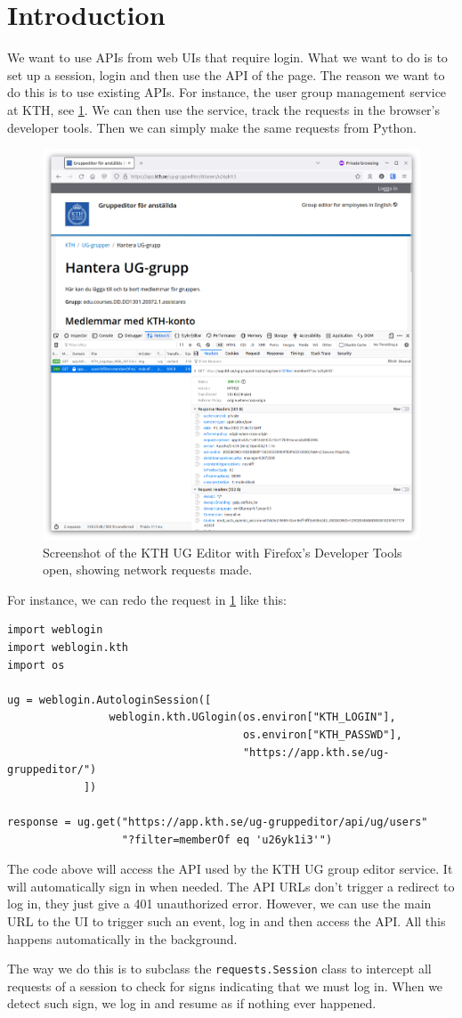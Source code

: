 \section{Introduction}

We want to use APIs from web UIs that require login.
What we want to do is to set up a session, login and then use the API of the 
page.
The reason we want to do this is to use existing APIs.
For instance, the user group management service at KTH, see \cref{UGEditor}.
We can then use the service, track the requests in the browser's developer 
tools.
Then we can simply make the same requests from Python.

\begin{figure}
  \includegraphics[width=\columnwidth]{figs/ug.png}
  \caption{Screenshot of the KTH UG Editor with Firefox's Developer Tools open, 
  showing network requests made.}
  \label{UGEditor}
\end{figure}

For instance, we can redo the request in \cref{UGEditor} like this:
\begin{verbatim}
import weblogin
import weblogin.kth
import os

ug = weblogin.AutologinSession([
                weblogin.kth.UGlogin(os.environ["KTH_LOGIN"],
                                     os.environ["KTH_PASSWD"],
                                     "https://app.kth.se/ug-gruppeditor/")
            ])

response = ug.get("https://app.kth.se/ug-gruppeditor/api/ug/users"
                  "?filter=memberOf eq 'u26yk1i3'")
\end{verbatim}
The code above will access the API used by the KTH UG group editor service.
It will automatically sign in when needed.
The API URLs don't trigger a redirect to log in, they just give a 401 
unauthorized error.
However, we can use the main URL to the UI to trigger such an event, log in and 
then access the API.
All this happens automatically in the background.

The way we do this is to subclass the \texttt{requests.Session} class to 
intercept all requests of a session to check for signs indicating that we must 
log in.
When we detect such sign, we log in and resume as if nothing ever happened.
